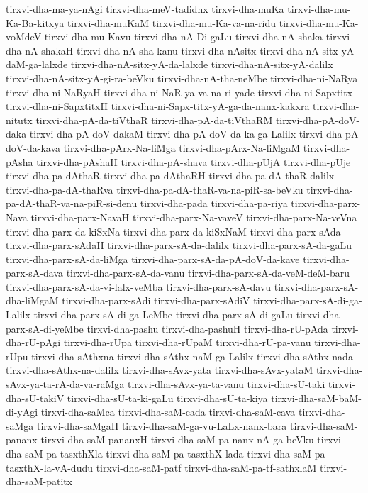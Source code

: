 {tirxvi-dha-ma-ya-nAgi
tirxvi-dha-meV-tadidhx
tirxvi-dha-muKa
tirxvi-dha-mu-Ka-Ba-kitxya
tirxvi-dha-muKaM
tirxvi-dha-mu-Ka-va-na-ridu
tirxvi-dha-mu-Ka-voMdeV
tirxvi-dha-mu-Kavu
tirxvi-dha-nA-Di-gaLu
tirxvi-dha-nA-shaka
tirxvi-dha-nA-shakaH
tirxvi-dha-nA-sha-kanu
tirxvi-dha-nAsitx
tirxvi-dha-nA-sitx-yA-daM-ga-lalxde
tirxvi-dha-nA-sitx-yA-da-lalxde
tirxvi-dha-nA-sitx-yA-dalilx
tirxvi-dha-nA-sitx-yA-gi-ra-beVku
tirxvi-dha-nA-tha-neMbe
tirxvi-dha-ni-NaRya
tirxvi-dha-ni-NaRyaH
tirxvi-dha-ni-NaR-ya-va-na-ri-yade
tirxvi-dha-ni-Sapxtitx
tirxvi-dha-ni-SapxtitxH
tirxvi-dha-ni-Sapx-titx-yA-ga-da-nanx-kakxra
tirxvi-dha-nitutx
tirxvi-dha-pA-da-tiVthaR
tirxvi-dha-pA-da-tiVthaRM
tirxvi-dha-pA-doV-daka
tirxvi-dha-pA-doV-dakaM
tirxvi-dha-pA-doV-da-ka-ga-Lalilx
tirxvi-dha-pA-doV-da-kava
tirxvi-dha-pArx-Na-liMga
tirxvi-dha-pArx-Na-liMgaM
tirxvi-dha-pAsha
tirxvi-dha-pAshaH
tirxvi-dha-pA-shava
tirxvi-dha-pUjA
tirxvi-dha-pUje
tirxvi-dha-pa-dAthaR
tirxvi-dha-pa-dAthaRH
tirxvi-dha-pa-dA-thaR-dalilx
tirxvi-dha-pa-dA-thaRva
tirxvi-dha-pa-dA-thaR-va-na-piR-sa-beVku
tirxvi-dha-pa-dA-thaR-va-na-piR-si-denu
tirxvi-dha-pada
tirxvi-dha-pa-riya
tirxvi-dha-parx-Nava
tirxvi-dha-parx-NavaH
tirxvi-dha-parx-Na-vaveV
tirxvi-dha-parx-Na-veVna
tirxvi-dha-parx-da-kiSxNa
tirxvi-dha-parx-da-kiSxNaM
tirxvi-dha-parx-sAda
tirxvi-dha-parx-sAdaH
tirxvi-dha-parx-sA-da-dalilx
tirxvi-dha-parx-sA-da-gaLu
tirxvi-dha-parx-sA-da-liMga
tirxvi-dha-parx-sA-da-pA-doV-da-kave
tirxvi-dha-parx-sA-dava
tirxvi-dha-parx-sA-da-vanu
tirxvi-dha-parx-sA-da-veM-deM-baru
tirxvi-dha-parx-sA-da-vi-lalx-veMba
tirxvi-dha-parx-sA-davu
tirxvi-dha-parx-sA-dha-liMgaM
tirxvi-dha-parx-sAdi
tirxvi-dha-parx-sAdiV
tirxvi-dha-parx-sA-di-ga-Lalilx
tirxvi-dha-parx-sA-di-ga-LeMbe
tirxvi-dha-parx-sA-di-gaLu
tirxvi-dha-parx-sA-di-yeMbe
tirxvi-dha-pashu
tirxvi-dha-pashuH
tirxvi-dha-rU-pAda
tirxvi-dha-rU-pAgi
tirxvi-dha-rUpa
tirxvi-dha-rUpaM
tirxvi-dha-rU-pa-vanu
tirxvi-dha-rUpu
tirxvi-dha-sAthxna
tirxvi-dha-sAthx-naM-ga-Lalilx
tirxvi-dha-sAthx-nada
tirxvi-dha-sAthx-na-dalilx
tirxvi-dha-sAvx-yata
tirxvi-dha-sAvx-yataM
tirxvi-dha-sAvx-ya-ta-rA-da-va-raMga
tirxvi-dha-sAvx-ya-ta-vanu
tirxvi-dha-sU-taki
tirxvi-dha-sU-takiV
tirxvi-dha-sU-ta-ki-gaLu
tirxvi-dha-sU-ta-kiya
tirxvi-dha-saM-baM-di-yAgi
tirxvi-dha-saMca
tirxvi-dha-saM-cada
tirxvi-dha-saM-cava
tirxvi-dha-saMga
tirxvi-dha-saMgaH
tirxvi-dha-saM-ga-vu-LaLx-nanx-bara
tirxvi-dha-saM-pananx
tirxvi-dha-saM-pananxH
tirxvi-dha-saM-pa-nanx-nA-ga-beVku
tirxvi-dha-saM-pa-tasxthXla
tirxvi-dha-saM-pa-tasxthX-lada
tirxvi-dha-saM-pa-tasxthX-la-vA-dudu
tirxvi-dha-saM-patf
tirxvi-dha-saM-pa-tf-sathxlaM
tirxvi-dha-saM-patitx
}
